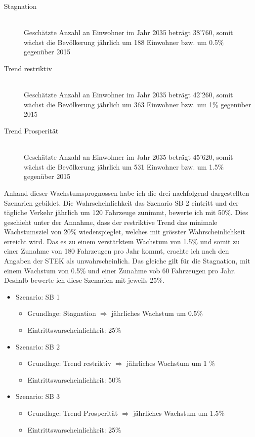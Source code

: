 \begin{description}
\item[Stagnation] \hfill \\
Geschätzte Anzahl an Einwohner im Jahr 2035 beträgt 38'760, somit wächst die Bevölkerung jährlich um 188 Einwohner bzw. um 0.5\% gegenüber 2015
\item[Trend restriktiv] \hfill \\
Geschätzte Anzahl an Einwohner im Jahr 2035 beträgt 42'260, somit wächst die Bevölkerung jährlich um 363 Einwohner bzw. um 1\% gegenüber 2015
\item[Trend Prosperität] \hfill \\
Geschätzte Anzahl an Einwohner im Jahr 2035 beträgt 45'620, somit wächst die Bevölkerung jährlich um 531 Einwohner bzw. um 1.5\% gegenüber 2015
\end{description}

Anhand dieser Wachstumsprognossen habe ich die drei nachfolgend dargestellten Szenarien gebildet. 
Die Wahrscheinlichkeit das Szenario SB 2 eintritt und der tägliche Verkehr jährlich um 120 Fahrzeuge zunimmt, bewerte ich mit 50\%. Dies geschieht unter der Annahme, dass der restriktive Trend das minimale Wachstumsziel von 20\% wiederspieglet, welches mit grösster Wahrscheinlichkeit erreicht wird. 
Das es zu einem verstärktem Wachstum von 1.5\% und somit zu einer Zunahme von 180 Fahrzeugen pro Jahr kommt, erachte ich nach den Angaben der STEK als unwahrscheinlich. Das gleiche gilt für die Stagnation, mit einem Wachstum von 0.5\% und einer Zunahme vob 60 Fahrzeugen pro Jahr. Deshalb bewerte ich diese Szenarien mit jeweils 25\%.

\begin{itemize}
\item Szenario: SB 1
	\begin{itemize}
	\item Grundlage: Stagnation $\Rightarrow$ jährliches Wachstum um 0.5\%
	\item Eintrittswarscheinlichkeit: 25\%
	\end{itemize}
\item Szenario: SB 2
	\begin{itemize}
	\item Grundlage: Trend restriktiv  $\Rightarrow$ jährliches Wachstum um 1 \%
	\item Eintrittswarscheinlichkeit: 50\%
	\end{itemize}
\item Szenario: SB 3
	\begin{itemize}
	\item Grundlage: Trend Prosperität  $\Rightarrow$ jährliches Wachstum um 1.5\%
	\item Eintrittswarscheinlichkeit: 25\%
	\end{itemize}
\end{itemize}

